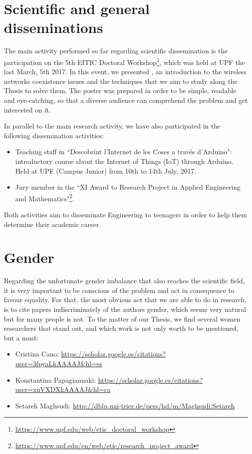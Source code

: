 \documentclass[12pt, a4paper,twoside]{article}
\begin{document}
	\section{Scientific and general disseminations}
	\label{section:dissemination}			
	The main activity performed so far regarding scientific dissemination is the participation on the 5th EITIC Doctoral Workshop\footnote{\url{https://www.upf.edu/web/etic_doctoral_workshop}}, which was held at UPF the last March, 5th 2017. In this event, we presented \cite{wilhelmi2017improving}, an introduction to the wireless networks coexistence issues and the techniques that we aim to study along the Thesis to solve them. The poster was prepared in order to be simple, readable and eye-catching, so that a diverse audience can comprehend the problem and get interested on it.
	
	In parallel to the main research activity, we have also participated in the following dissemination activities:
	\begin{itemize}
		\item Teaching staff in ``Descobrint l'Internet de les Coses a través d'Arduino": introductory course about the Internet of Things (IoT) through Arduino. Held at UPF (Campus Junior) from 10th to 14th July, 2017.
		\item Jury member in the ``XI Award to Research Project in Applied Engineering and Mathematics"\footnote{\url{https://www.upf.edu/en/web/etic/research_project_award}}.
	\end{itemize}
	Both activities aim to disseminate Engineering to teenagers in order to help them determine their academic career.
	
	\section{Gender}
	\label{section:gender}	
	Regarding the unfortunate gender imbalance that also reaches the scientific field, it is very important to be conscious of the problem and act in consequence to favour equality. For that, the most obvious act that we are able to do in research, is to cite papers indiscriminately of the authors gender, which seems very natural but for many people is not. To the matter of our Thesis, we find several women researchers that stand out, and which work is not only worth to be mentioned, but a must: 
	\begin{itemize}
		\item Cristina Cano: \url{https://scholar.google.es/citations?user=3fpyaLkAAAAJ&hl=es}
		\item Konstantina Papagiannaki: \url{https://scholar.google.es/citations?user=xuVXDXkAAAAJ&hl=ca}
		\item Setareh Maghsudi: \url{http://dblp.uni-trier.de/pers/hd/m/Maghsudi:Setareh}
	\end{itemize}	
			
	
	
\end{document}
